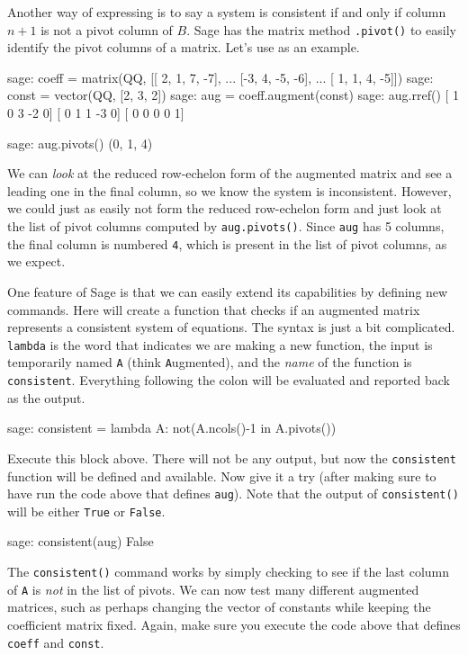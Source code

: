 Another way of expressing  is to say a system is consistent if and only if column $n+1$ is not a pivot column of $B$.  Sage has the matrix method \verb?.pivot()? to easily identify the pivot columns of a matrix.  Let's use  as an example.
%
\begin{sageexample}
sage: coeff = matrix(QQ, [[ 2, 1,  7, -7],
...                       [-3, 4, -5, -6],
...                       [ 1, 1,  4, -5]])
sage: const = vector(QQ, [2, 3, 2])
sage: aug = coeff.augment(const)
sage: aug.rref()
[ 1  0  3 -2  0]
[ 0  1  1 -3  0]
[ 0  0  0  0  1]
\end{sageexample}
%
\begin{sageexample}
sage: aug.pivots()
(0, 1, 4)
\end{sageexample}
%
We can \emph{look} at the reduced row-echelon form of the augmented matrix and see a leading one in the final column, so we know the system is inconsistent.  However, we could just as easily not form the reduced row-echelon form and just look at the list of pivot columns computed by \verb?aug.pivots()?.  Since \verb?aug? has 5 columns, the final column is numbered \verb?4?, which is present in the list of pivot columns, as we expect.\par
%
One feature of Sage is that we can easily extend its capabilities by defining new commands.  Here will create a function that checks if an augmented matrix represents a consistent system of equations.  The syntax is just a bit complicated.  \verb?lambda? is the word that indicates we are making a new function, the input is temporarily named \verb?A? (think \verb?A?ugmented), and the \emph{name} of the function is \verb?consistent?.  Everything following the colon will be evaluated and reported back as the output.
%
\begin{sageexample}
sage: consistent = lambda A: not(A.ncols()-1 in A.pivots())
\end{sageexample}
%
Execute this block above.  There will not be any output, but now the \verb?consistent? function will be defined and available.  Now give it a try (after making sure to have run the code above that defines \verb?aug?).  Note that the output of \verb?consistent()? will be either \verb?True? or \verb?False?.
%
\begin{sageexample}
sage: consistent(aug)
False
\end{sageexample}
%
The \verb?consistent()? command works by simply checking to see if the last column of \verb?A? is \emph{not} in the list of pivots.  We can now test many different augmented matrices, such as perhaps changing the vector of constants while keeping the coefficient matrix fixed.  Again, make sure you execute the code above that defines \verb?coeff? and \verb?const?.
